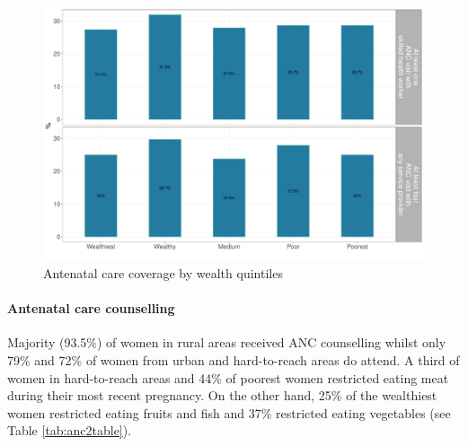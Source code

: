 \documentclass[12pt,a4paper]{article}
\let\oldparagraph\paragraph
\renewcommand{\paragraph}[1]{\oldparagraph{#1}\mbox{}}
\begin{document}
\begin{figure}[H]

{\centering \includegraphics{kayahReport_files/figure-latex/anc2plot-1} 

}

\caption{Antenatal care coverage by wealth quintiles}\label{fig:anc2plot}
\end{figure}

\hypertarget{ancCounselling}{%
\paragraph{Antenatal care counselling}\label{ancCounselling}}

Majority (93.5\%) of women in rural areas received ANC counselling whilst only 79\% and 72\% of women from urban and hard-to-reach areas do attend. A third of women in hard-to-reach areas and 44\% of poorest women restricted eating meat during their most recent pregnancy. On the other hand, 25\% of the wealthiest women restricted eating fruits and fish and 37\% restricted eating vegetables (see Table \ref{tab:anc2table}).
\end{document}
